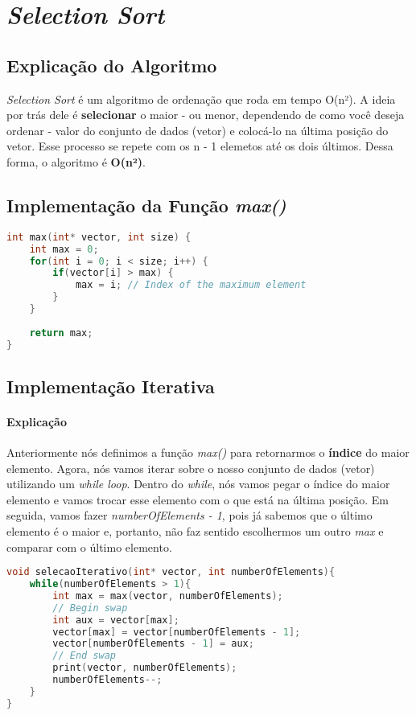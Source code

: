 \section{\textit{Selection Sort}}

\subsection{Explicação do Algoritmo}
\textit{Selection Sort} é um algoritmo de ordenação que roda em tempo O(n²). A ideia por trás dele é \textbf{selecionar} o maior - ou menor, dependendo de como você deseja ordenar - 
valor do conjunto de dados (vetor) e colocá-lo na última posição do vetor. Esse processo se repete com os n - 1 elemetos até os dois últimos. Dessa forma, o algoritmo é \textbf{O(n²)}.

\subsection{Implementação da Função \textit{max()}}
\begin{lstlisting}[language=C]
int max(int* vector, int size) {
    int max = 0;
    for(int i = 0; i < size; i++) {
        if(vector[i] > max) {
            max = i; // Index of the maximum element
        }
    }
    
    return max;
}
\end{lstlisting}

\subsection{Implementação Iterativa}
\paragraph{Explicação}
Anteriormente nós definimos a função \textit{max()} para retornarmos o \textbf{índice} do maior elemento. Agora, nós vamos iterar sobre o nosso conjunto de dados (vetor) utilizando
um \textit{while loop}. Dentro do \textit{while}, nós vamos pegar o índice do maior elemento e vamos trocar esse elemento com o que está na última posição. Em seguida, vamos fazer
\textit{numberOfElements - 1}, pois já sabemos que o último elemento é o maior e, portanto, não faz sentido escolhermos um outro \textit{max} e comparar com o último elemento.
\begin{lstlisting}[language=C]
void selecaoIterativo(int* vector, int numberOfElements){
    while(numberOfElements > 1){
        int max = max(vector, numberOfElements);
        // Begin swap
        int aux = vector[max];
        vector[max] = vector[numberOfElements - 1];
        vector[numberOfElements - 1] = aux;
        // End swap
        print(vector, numberOfElements);
        numberOfElements--;
    }
}
\end{lstlisting}

